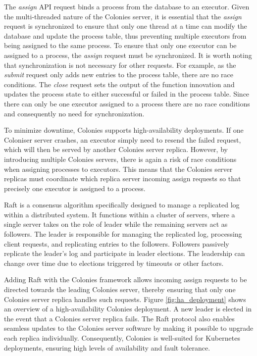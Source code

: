\documentclass{article}
\begin{document}
The \emph{assign} API request binds a process from the database to an executor. Given the multi-threaded nature of the Colonies server, it is essential that the \emph{assign} request is synchronized to ensure that only one thread at a time can modify the database and update the process table, thus preventing multiple executors from being assigned to the same process. To ensure that only one executor can be assigned to a process, the \emph{assign} request must be synchronized. It is worth noting that synchronization is not necessary for other requests. For example, as the \emph{submit} request only adds new entries to the process table, there are no race conditions. The \emph{close} request sets the output of the function innovation and updates the process state to either successful or failed in the process table. Since there can only be one executor assigned to a process there are no race conditions and consequently no need for synchronization.

To minimize downtime, Colonies supports high-availability deployments. If one Coloniser server crashes, an executor simply need to resend the failed request, which will then be served by another Colonies server replica. However, by introducing multiple Colonies servers, there is again a risk of race conditions when assigning processes to executors. This means that the Colonies server replicas must coordinate which replica server incoming assign requests so that precisely one executor is assigned to a process.

Raft \cite{raft} is a consensus algorithm specifically designed to manage a replicated log within a distributed system. It functions within a cluster of servers, where a single server takes on the role of leader while the remaining servers act as followers. The leader is responsible for managing the replicated log, processing client requests, and replicating entries to the followers. Followers passively replicate the leader's log and participate in leader elections. The leadership can change over time due to elections triggered by timeouts or other factors.

Adding Raft with the Colonies framework allows incoming assign requests to be directed towards the leading Colonies server, thereby ensuring that only one Colonies server replica handles such requests. Figure \ref{fig:ha_deployment} shows an overview of a high-availability Colonies deployment. A new leader is elected in the event that a Colonies server replica fails. The Raft protocol also enables seamless updates to the Colonies server software by making it possible to upgrade each replica individually. Consequently, Colonies is well-suited for Kubernetes deployments, ensuring high levels of availability and fault tolerance.
\end{document}
